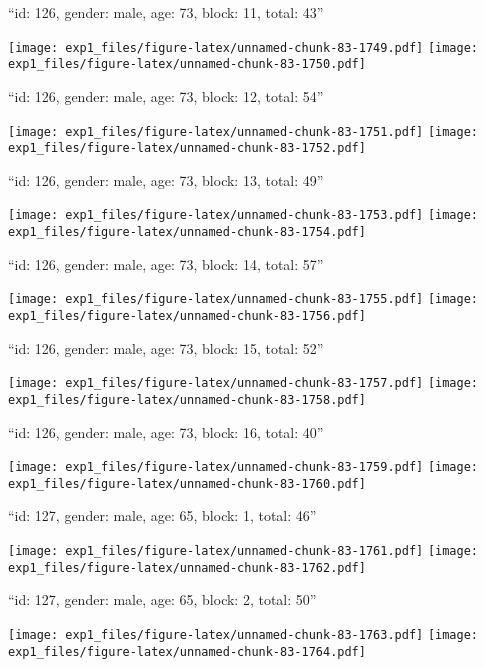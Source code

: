 \documentclass[11pt,,]{article}
\begin{document}
\newpage
[1] 

``id: 126, gender: male, age: 73, block: 11, total: 43''

\texttt{[image: exp1\_files/figure-latex/unnamed-chunk-83-1749.pdf]}
\texttt{[image: exp1\_files/figure-latex/unnamed-chunk-83-1750.pdf]}

\newpage
[1] 

``id: 126, gender: male, age: 73, block: 12, total: 54''

\texttt{[image: exp1\_files/figure-latex/unnamed-chunk-83-1751.pdf]}
\texttt{[image: exp1\_files/figure-latex/unnamed-chunk-83-1752.pdf]}

\newpage
[1] 

``id: 126, gender: male, age: 73, block: 13, total: 49''

\texttt{[image: exp1\_files/figure-latex/unnamed-chunk-83-1753.pdf]}
\texttt{[image: exp1\_files/figure-latex/unnamed-chunk-83-1754.pdf]}

\newpage
[1] 

``id: 126, gender: male, age: 73, block: 14, total: 57''

\texttt{[image: exp1\_files/figure-latex/unnamed-chunk-83-1755.pdf]}
\texttt{[image: exp1\_files/figure-latex/unnamed-chunk-83-1756.pdf]}

\newpage
[1] 

``id: 126, gender: male, age: 73, block: 15, total: 52''

\texttt{[image: exp1\_files/figure-latex/unnamed-chunk-83-1757.pdf]}
\texttt{[image: exp1\_files/figure-latex/unnamed-chunk-83-1758.pdf]}

\newpage
[1] 

``id: 126, gender: male, age: 73, block: 16, total: 40''

\texttt{[image: exp1\_files/figure-latex/unnamed-chunk-83-1759.pdf]}
\texttt{[image: exp1\_files/figure-latex/unnamed-chunk-83-1760.pdf]}

\newpage
[1] 

``id: 127, gender: male, age: 65, block: 1, total: 46''

\texttt{[image: exp1\_files/figure-latex/unnamed-chunk-83-1761.pdf]}
\texttt{[image: exp1\_files/figure-latex/unnamed-chunk-83-1762.pdf]}

\newpage
[1] 

``id: 127, gender: male, age: 65, block: 2, total: 50''

\texttt{[image: exp1\_files/figure-latex/unnamed-chunk-83-1763.pdf]}
\texttt{[image: exp1\_files/figure-latex/unnamed-chunk-83-1764.pdf]}
\end{document}
